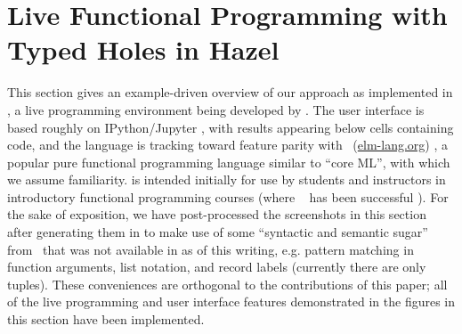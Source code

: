 \newcommand{\examplesSec}{Live Functional Programming with Typed Holes in Hazel}
\section{\protect\examplesSec} %
\label{sec:examples}




\newcommand{\overviewExample}[2]{\paragraph{Example {#1}: {#2}}}

This section gives an example-driven overview of our  approach as implemented in  \Hazel, a live programming environment being developed by \citet{HazelnutSNAPL}. The \Hazel user interface is based roughly on IPython/Jupyter \cite{PER-GRA:2007}, with results appearing below cells containing code, and the \Hazel language is tracking toward feature parity with \Elm~(\url{elm-lang.org}) \cite{czaplicki2012elm,Elm}, a popular pure functional programming language similar to ``core ML'', with which we assume familiarity. \Hazel is intended initially for use by students and instructors in introductory functional programming courses (where \Elm~ has been successful \cite{DBLP:journals/corr/abs-1805-05125}). 
For the sake of 
exposition, we have post-processed the screenshots in this section after generating them in \Hazel to make use of some ``syntactic and semantic sugar'' from \Elm~that was not available in \Hazel as of this writing, e.g. pattern matching in function arguments, list  notation, and record labels (currently there are only tuples). These conveniences are orthogonal to the contributions of this paper; all of the live programming and user interface features demonstrated in the figures in this section have been implemented.







